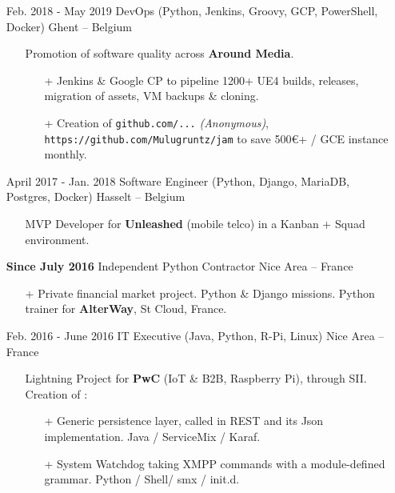 \documentclass{res}
\begin{document}
\begin{resume}
\begin{itemize}
\begin{itemize}
        \end{itemize}
        \item[] Feb.  2018 - May 2019 \tabto{5cm} DevOps (Python, Jenkins, Groovy, GCP, PowerShell, Docker) \hfill Ghent -- Belgium
        \begin{itemize}
            \item[] Promotion of software quality across \textbf{Around Media}.
            \begin{itemize}
                \item[+] Jenkins \& Google CP to pipeline 1200+ UE4 builds, releases, migration of assets, VM backups \& cloning.
                \item[+] Creation of \ifisanon \texttt{github.com/...} \textit{(Anonymous)}, \else \texttt{https://github.com/Mulugruntz/jam} \fi to save 500\euro+ / GCE instance monthly.
            \end{itemize}
        \end{itemize}
        \item[] April 2017 - Jan. 2018 \tabto{5cm} Software Engineer (Python, Django, MariaDB, Postgres, Docker) \hfill Hasselt -- Belgium
        \begin{itemize}
            \item[] MVP Developer for  \textbf{Unleashed} (mobile telco) in a Kanban + Squad environment.
        \end{itemize}
        \item[] \textbf{Since July 2016} \tabto{5cm} Independent Python Contractor \hfill Nice Area -- France
        \begin{itemize}
            \item[+] Private financial market project. Python \& Django missions. Python trainer for \textbf{AlterWay}, St Cloud, France.
        \end{itemize}
        \item[] Feb. 2016 - June 2016 \tabto{5cm} IT Executive (Java, Python, R-Pi, Linux) \hfill Nice Area -- France
        \begin{itemize}
            \item[] Lightning Project for \textbf{PwC} (IoT \& B2B, Raspberry Pi), through SII. Creation of :
            \begin{itemize}
                \item[+] Generic persistence layer, called in REST and its Json implementation. Java / ServiceMix / Karaf.
                \item[+] System Watchdog taking XMPP commands with a module-defined grammar. Python / Shell/ smx / init.d.

\end{itemize}
\end{itemize}
\end{itemize}
\end{resume}
\end{document}
